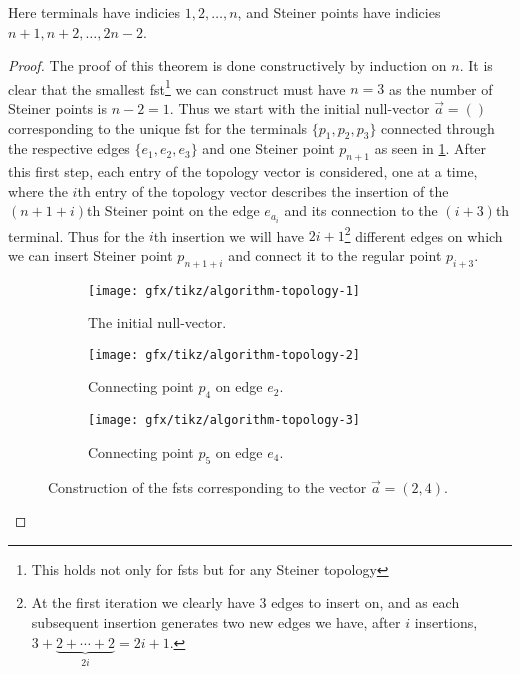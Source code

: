Here terminals have indicies $1, 2, \ldots, n$, and Steiner points have indicies
$n + 1, n + 2, \ldots, 2 n - 2$.

\begin{proof}
  The proof of this theorem is done constructively by induction on $n$. It is
  clear that the smallest \ac{fst}\footnote{This holds not only for \acp{fst}
    but for any Steiner topology} we can construct must have $n = 3$ as the
  number of Steiner points is $n - 2 = 1$. Thus we start with the initial
  null-vector $\vec{a} = ()$ corresponding to the unique \ac{fst} for the
  terminals $\{p_1, p_2, p_3\}$ connected through the respective edges $\{e_1,
  e_2, e_3\}$ and one Steiner point $p_{n+1}$ as seen in
  \cref{fig:algorithm-topology-1}. After this first step, each entry of the
  topology vector is considered, one at a time, where the $i$th entry of the
  topology vector describes the insertion of the $(n+1+i)$th Steiner point on
  the edge $e_{a_{i}}$ and its connection to the $(i+3)$th terminal. Thus for
  the $i$th insertion we will have $2i+1$\footnote{At the first iteration we
    clearly have $3$ edges to insert on, and as each subsequent insertion
    generates two new edges we have, after $i$ insertions, $3 + \underbrace{2 +
      \cdots + 2}_{2 i} = 2 i + 1$.} different edges on which we can insert
  Steiner point $p_{n + 1 + i}$ and connect it to the regular point $p_{i+3}$.
  
  \begin{figure}[htbp] \centering
    \begin{subfigure}[t]{0.267\textwidth}
      \texttt{[image: gfx/tikz/algorithm-topology-1]}
      \caption{The initial null-vector.\label{fig:algorithm-topology-1}}
    \end{subfigure}\hspace{1em}%
    \begin{subfigure}[t]{0.267\textwidth}
      \texttt{[image: gfx/tikz/algorithm-topology-2]}
      \caption{Connecting point $p_4$ on edge $e_2$.\label{fig:algorithm-topology-2}}
    \end{subfigure}\hspace{1em}%
    \begin{subfigure}[t]{0.267\textwidth}
      \texttt{[image: gfx/tikz/algorithm-topology-3]}
      \caption{Connecting point $p_5$ on edge $e_4$.\label{fig:algorithm-topology-3}}
    \end{subfigure}
    \caption[Construction of FSTs]{Construction of the \acsp{fst} corresponding
      to the vector $\vec{a} = (2, 4)$.\label{fig:algorithm-topologies}}
  \end{figure}
\end{proof}

